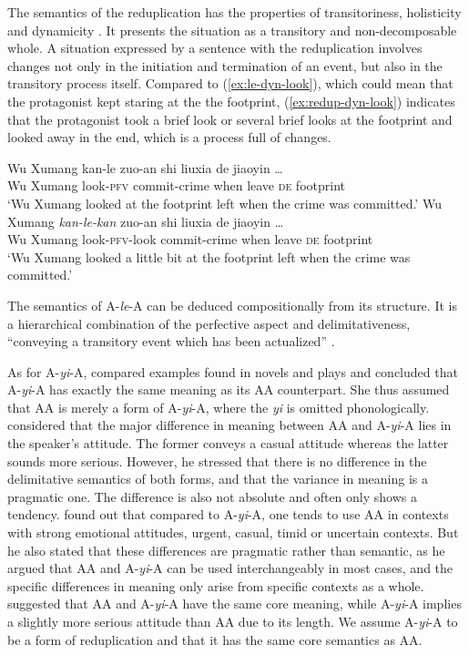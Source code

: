 The semantics of the reduplication has the properties of transitoriness,  holisticity  and dynamicity \citetext{\citealp[70--79]{Dai1997}; \citealp[155--159]{XiaoMcEnery2004}}.
It presents the situation as a  transitory and non\hyp{}decomposable whole.
A situation expressed by a sentence with the reduplication involves changes not only in the initiation and termination of an event, but also in the transitory process itself.
Compared to (\ref{ex:le-dyn-look}), which could mean that the protagonist kept staring at the the footprint,
(\ref{ex:redup-dyn-look}) indicates that the protagonist took a brief look or several brief looks at the footprint and looked away in the end, which is a process full of changes.

\ea
  \ea\label{ex:le-dyn-look}
    \gll Wu Xumang kan-le zuo-an shi liuxia de jiaoyin \ldots\\
    Wu Xumang look-\textsc{pfv} commit-crime when leave \textsc{de} footprint\\ 
    \glt `Wu Xumang looked at the footprint left when the crime was committed.'
  \ex\label{ex:redup-dyn-look}
    \gll Wu Xumang \textit{kan-le-kan} zuo-an shi liuxia de jiaoyin \ldots\\
    Wu Xumang look-\textsc{pfv}-look commit-crime when leave \textsc{de} footprint\\ 
    \glt `Wu Xumang looked a little bit at the footprint left when the crime was committed.'
  \z
\z

The semantics of A-\textit{le}-A can be deduced compositionally from its structure. 
It is a hierarchical combination of the perfective aspect and delimitativeness, ``conveying a transitory event which has been actualized'' \citep[151]{XiaoMcEnery2004}.


As for A-\textit{yi}-A, \citet[273]{Fan1964} compared examples found in novels and plays and concluded that A-\textit{yi}-A has exactly the same meaning as its AA counterpart.
She thus assumed that AA is merely a form of A-\textit{yi}-A, where the \textit{yi} is omitted phonologically.
\citet{Xing2000} considered that the major  difference in meaning  between AA and A-\textit{yi}-A lies in the speaker's attitude.
The former conveys a casual attitude whereas the latter sounds more serious.
However, he stressed that there is no difference in the delimitative semantics of both forms,
and that the variance in meaning is a pragmatic one.
The difference is also not absolute and often only shows a tendency.
\citet{Xu2002} found out that compared to A-\textit{yi}-A, one tends to use AA in contexts with strong emotional attitudes, urgent, casual, timid or uncertain contexts.
But he also stated that these differences are pragmatic rather than semantic, 
as he argued that AA and A-\textit{yi}-A can be used interchangeably in most cases,
and the specific differences in meaning only arise from specific contexts as a whole.
\citet[15]{Yang2003} suggested that AA and A-\textit{yi}-A have the same core meaning, while A-\textit{yi}-A implies a slightly more serious attitude than AA due to its length.
We assume A-\textit{yi}-A to be a form of reduplication and that it has the same core semantics as AA.

